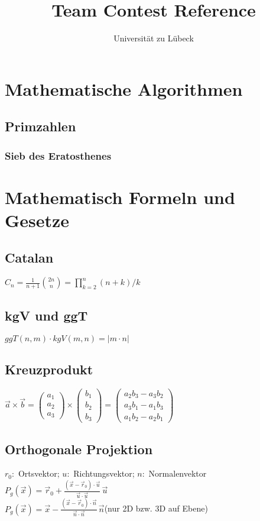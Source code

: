 \documentclass[10pt,a4paper,ngerman]{article}
\title{Team Contest Reference}
\author{Universität zu Lübeck}
\begin{document}
\lstset{basicstyle=\ttfamily\footnotesize,numbers=left,numberstyle=\tiny,tabsize=2,numbersep=5pt}
\maketitle

\section{Mathematische Algorithmen}
\subsection{Primzahlen}
\subsubsection{Sieb des Eratosthenes}

\section{Mathematisch Formeln und Gesetze}
\subsection{Catalan}
$C_n = \frac1{n+1}\binom{2n}{n}=\prod_{k=2}^n (n+k)/k$
\subsection{kgV und ggT}
$ggT(n,m)\cdot kgV(m,n)=|m\cdot n|$
\subsection{Kreuzprodukt}
$\vec{a}\times\vec{b}
  =
  \begin{pmatrix}a_1 \\ a_2 \\ a_3\end{pmatrix}
  \times
  \begin{pmatrix}b_1 \\ b_2 \\ b_3 \end{pmatrix}
  =
  \begin{pmatrix}
    a_2b_3 - a_3b_2 \\
    a_3b_1 - a_1b_3 \\
    a_1b_2 - a_2b_1
  \end{pmatrix}$
\subsection{Orthogonale Projektion}
$r_0:$ Ortsvektor; $u:$ Richtungsvektor; $n:$ Normalenvektor\\
$P_g(\vec x) =  \vec r_0 + \frac{( \vec x - \vec r_0 ) \cdot \vec u}{\vec u \cdot \vec u} \, \vec u$\\
$P_g(\vec x) = \vec x - \frac{( \vec x - \vec r_0 ) \cdot \vec n}{\vec n \cdot \vec n} \, \vec n$(nur 2D bzw. 3D auf Ebene)\\
\end{document}
